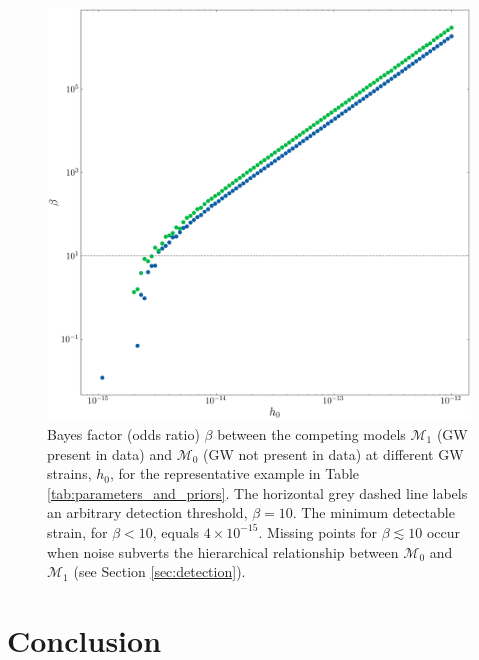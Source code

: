 \documentclass[fleqn,usenatbib,useAMS]{mnras}
\begin{document}
\begin{figure}
	\includegraphics[width=\columnwidth]{images/CanonicalBayesPlot2000}
	\caption{Bayes factor (odds ratio) $\beta$ between the competing models $\mathcal{M}_1$ (GW present in data) and $\mathcal{M}_0$ (GW not present in data) at different GW strains, $h_0$, for the representative example in Table \ref{tab:parameters_and_priors}. The horizontal grey dashed line labels an arbitrary detection threshold, $\beta = 10$. The minimum detectable strain, for $\beta < 10$, equals $4 \times 10^{-15}$. Missing points for $\beta \lesssim 10$ occur when noise subverts the hierarchical relationship between $\mathcal{M}_0$ and $\mathcal{M}_1$ (see Section \ref{sec:detection}).}
	\label{fig:bayes}
\end{figure}



 



\section{Conclusion}\label{sec:discussion}
\end{document}
